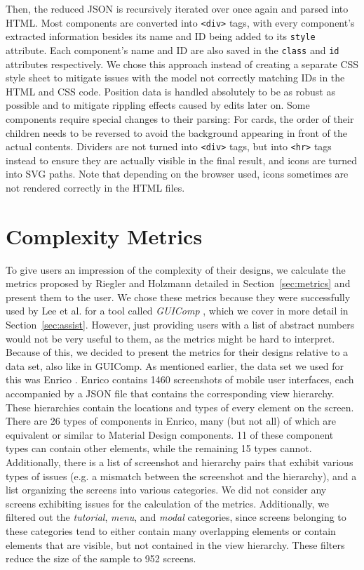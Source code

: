 \documentclass[11pt,titlepage,oneside,openany]{book}
\begin{document}
Then, the reduced JSON is recursively iterated over once again and parsed into HTML. Most components are converted into \texttt{<div>} tags, with every component's extracted information besides its name and ID being added to its \texttt{style} attribute. Each component's name and ID are also saved in the \texttt{class} and \texttt{id} attributes respectively. We chose this approach instead of creating a separate CSS style sheet to mitigate issues with the model not correctly matching IDs in the HTML and CSS code. Position data is handled absolutely to be as robust as possible and to mitigate rippling effects caused by edits later on. Some components require special changes to their parsing: For cards, the order of their children needs to be reversed to avoid the background appearing in front of the actual contents. Dividers are not turned into \texttt{<div>} tags, but into \texttt{<hr>} tags instead to ensure they are actually visible in the final result, and icons are turned into SVG paths. Note that depending on the browser used, icons sometimes are not rendered correctly in the HTML files. 

\section{Complexity Metrics}\label{sec:metrics_app}

To give users an impression of the complexity of their designs, we calculate the metrics proposed by Riegler and Holzmann detailed in Section~\ref{sec:metrics} and present them to the user. We chose these metrics because they were successfully used by Lee et al. for a tool called \emph{GUIComp} \cite{lee_guicomp_2020}, which we cover in more detail in Section~\ref{sec:assist}. However, just providing users with a list of abstract numbers would not be very useful to them, as the metrics might be hard to interpret. Because of this, we decided to present the metrics for their designs relative to a data set, also like in GUIComp. As mentioned earlier, the data set we used for this was Enrico \cite{leiva_enrico_2021}. Enrico contains 1460 screenshots of mobile user interfaces, each accompanied by a JSON file that contains the corresponding view hierarchy. These hierarchies contain the locations and types of every element on the screen. There are 26 types of components in Enrico, many (but not all) of which are equivalent or similar to Material Design components. 11 of these component types can contain other elements, while the remaining 15 types cannot. Additionally, there is a list of screenshot and hierarchy pairs that exhibit various types of issues (e.g. a mismatch between the screenshot and the hierarchy), and a list organizing the screens into various categories. We did not consider any screens exhibiting issues for the calculation of the metrics. Additionally, we filtered out the \emph{tutorial}, \emph{menu}, and \emph{modal} categories, since screens belonging to these categories tend to either contain many overlapping elements or contain elements that are visible, but not contained in the view hierarchy. These filters reduce the size of the sample to 952 screens. 
\end{document}
